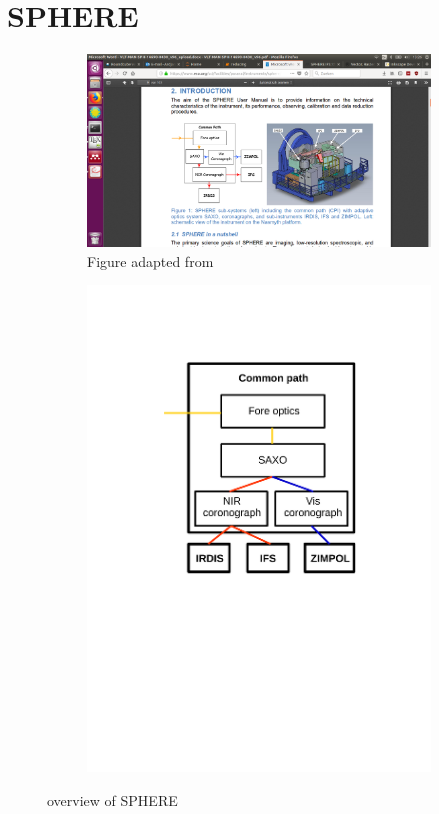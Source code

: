\documentclass[twoside,single,12pt]{lion-msc}
\begin{document}
\section{SPHERE}
\begin{figure}[hb]
\centering
\begin{subfigure}{.58\textwidth}
  \centering
  \includegraphics[trim={25cm 6cm 7cm 8.8cm},clip,width = 1\linewidth]{overviewSPHERE}
  \caption{Figure adapted from \citep{Observatory2007}}
\end{subfigure}\hfill
\begin{subfigure}{.38\textwidth}
  \centering
  \includegraphics[trim={5cm 12cm 3.5cm 3.5cm},clip,width=1\linewidth]{overview_SPHERE}
  \caption{}
\end{subfigure}
\caption{overview of SPHERE}
\label{fig:overviewSPHERE}
\end{figure}
\end{document}
